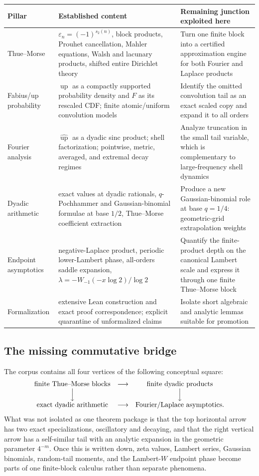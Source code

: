\documentclass[11pt,oneside]{article}
\numberwithin{equation}{section}
\theoremstyle{definition}
\theoremstyle{remark}
\newcommand{\Up}{\operatorname{up}}
\newcommand{\eps}{\varepsilon}
\begin{document}
\begin{center}
\small
\begin{tabularx}{\textwidth}{@{}p{}X X@{}}
\toprule
Pillar & Established content & Remaining junction exploited here \\
\midrule
Thue--Morse & $\eps_n=(-1)^{s_2(n)}$, block products, Prouhet cancellation, Mahler equations,
Walsh and lacunary products, shifted entire Dirichlet theory & Turn one finite block into a
certified approximation engine for both Fourier and Laplace products \\
Fabius/up probability & $\Up$ as a compactly supported probability density and $F$ as its
rescaled CDF; finite atomic/uniform convolution models & Identify the omitted convolution tail
as an exact scaled copy and expand it to all orders \\
Fourier analysis & $\widehat{\Up}$ as a dyadic sinc product; shell factorization; pointwise,
metric, averaged, and extremal decay regimes & Analyze truncation in the small tail variable,
which is complementary to large-frequency shell dynamics \\
Dyadic arithmetic & exact values at dyadic rationals, $q$-Pochhammer and Gaussian-binomial
formulae at base $1/2$, Thue--Morse coefficient extraction & Produce a new Gaussian-binomial
role at base $q=1/4$: geometric-grid extrapolation weights \\
Endpoint asymptotics & negative-Laplace product, periodic lower-Lambert phase, all-orders saddle
expansion, $\lambda=-W_{-1}(-x\log2)/\log2$ & Quantify the finite-product depth on the canonical
Lambert scale and express it through one finite Thue--Morse block \\
Formalization & extensive Lean construction and exact proof correspondence; explicit quarantine
of unformalized claims & Isolate short algebraic and analytic lemmas suitable for promotion \\
\bottomrule
\end{tabularx}
\end{center}

\subsection{The missing commutative bridge}

The corpus contains all four vertices of the following conceptual square:
\[
\begin{array}{ccc}
\text{finite Thue--Morse blocks} & \longrightarrow & \text{finite dyadic products}\\
\Big\downarrow && \Big\downarrow\\
\text{exact dyadic arithmetic} & \longrightarrow & \text{Fourier/Laplace asymptotics}.
\end{array}
\]
What was not isolated as one theorem package is that the top horizontal arrow has two exact
specializations, oscillatory and decaying, and that the right vertical arrow has a
self-similar tail with an analytic expansion in the geometric parameter $4^{-m}$.  Once this
is written down, zeta values, Lambert series, Gaussian binomials, random-tail moments, and the
Lambert-$W$ endpoint phase become parts of one finite-block calculus rather than separate
phenomena.
\end{document}
